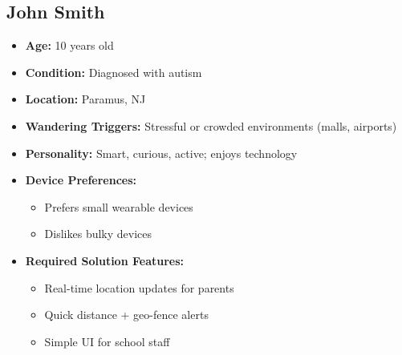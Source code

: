 \subsection*{John Smith}
\begin{itemize}[leftmargin=2em]
    \item \textbf{Age:} 10 years old
    \item \textbf{Condition:} Diagnosed with autism
    \item \textbf{Location:} Paramus, NJ
    \item \textbf{Wandering Triggers:} Stressful or crowded environments (malls, airports)
    \item \textbf{Personality:} Smart, curious, active; enjoys technology
    \item \textbf{Device Preferences:}
        \begin{itemize}
            \item Prefers small wearable devices
            \item Dislikes bulky devices
        \end{itemize}
    \item \textbf{Required Solution Features:}
        \begin{itemize}
            \item Real-time location updates for parents
            \item Quick distance + geo-fence alerts
            \item Simple UI for school staff
        \end{itemize}
\end{itemize}

